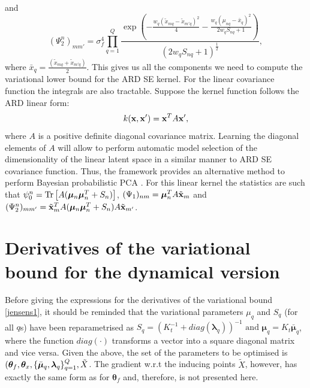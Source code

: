 and 
$$
(\Psi^n_2)_{m m'} = \sigma_f^4 
\prod_{q=1}^Q 
    \frac{
         \exp \left( - \frac{w_q (\tilde{x}_{mq} -
    	\tilde{x}_{m'q})^2}{4} - \frac{w_q \left(\mu_{nq} -
 		\bar{x}_{q} \right)^2}{2 w_q S_{nq} + 1} \right)
     }
     {(2 w_q S_{nq} + 1)^{\frac{1}{2}}
     },
$$  
where $\bar{x}_{q} = \frac{(\tilde{x}_{mq} + \tilde{x}_{m'q})}{2}$. This gives us all
the components we need to compute the variational lower bound for the
ARD SE kernel. For the linear covariance function the integrals
are also tractable. Suppose the kernel function follows the ARD linear
form: 
\begin{equation} 
k(\mathbf{x},\mathbf{x}') = \mathbf{x}^T A \mathbf{x}', 
\end{equation}
where $A$ is a positive definite diagonal covariance matrix.  Learning
the diagonal elements of $A$ will allow to perform automatic model selection of
the dimensionality of the linear latent space in a similar manner to
ARD SE covariance function. Thus, the framework provides an alternative
method to perform Bayesian probabilistic PCA
\cite{Bishop:bayesPCA98,Minka:automatic01}. For this linear kernel
the statistics are such that $ \psi_0^n =
\text{Tr}\left[A (\boldsymbol \mu_n \boldsymbol \mu_n^T + S_n) \right]$,
$(\Psi_1)_{nm} = \boldsymbol \mu_n^T A \tilde{\mathbf{x}}_m$ and $(\Psi_2^n)_{mm'} =
\tilde{\mathbf{x}}_m^T A (\boldsymbol \mu_n\boldsymbol \mu_n^T + S_n ) A \tilde{\mathbf{x}}_{m'}$.


\section{Derivatives of the variational bound for the dynamical version}
Before giving the expressions for the derivatives of the variational bound \eqref{jensens1},
it should be reminded that the variational parameters $\mu_q$ and $S_q$ (for all $q$s) have been
reparametrised as $S_q = \left( \mathit{K}_t^{-1} + diag(\boldsymbol \lambda_q) \right)^{-1}  \text{ and }   \boldsymbol \mu_q = K_t \bar{\boldsymbol \mu}_q$, where the function $diag(\cdot)$ transforms a vector into a square diagonal matrix and vice versa. Given the above, the set of the parameters to be optimised is 
$( \boldsymbol \theta_f, \boldsymbol \theta_x, \{ \bar{\boldsymbol \mu}_q, \boldsymbol \lambda_q \}_{q=1}^Q, \tilde{X}$. The gradient w.r.t the inducing points $\tilde{X}$, however, has exactly the same form as for $\boldsymbol \theta_f$ and, therefore, is not presented here.

